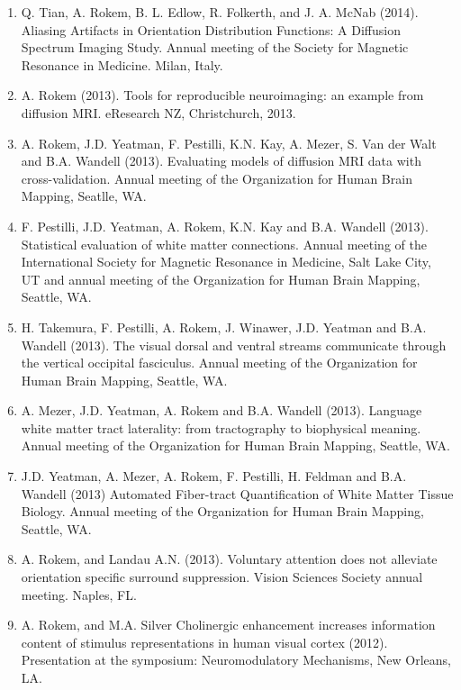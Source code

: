 \documentclass[11pt,fullpage]{article}
\begin{document}
\begin{enumerate}
\item Q. Tian, A. Rokem, B. L. Edlow, R. Folkerth, and J. A. McNab (2014). Aliasing Artifacts in Orientation Distribution Functions: A Diffusion Spectrum Imaging Study. Annual meeting of the Society for Magnetic Resonance in Medicine. Milan, Italy.

\item A. Rokem (2013). Tools for reproducible neuroimaging: an example from diffusion MRI. eResearch NZ, Christchurch, 2013.

\item A. Rokem, J.D. Yeatman, F. Pestilli, K.N. Kay, A. Mezer, S. Van der Walt and B.A. Wandell (2013). Evaluating models of diffusion MRI data with cross-validation. Annual meeting of the Organization for Human Brain Mapping, Seatlle, WA.

\item F. Pestilli, J.D. Yeatman, A. Rokem, K.N. Kay and B.A. Wandell (2013). Statistical evaluation of white matter connections. Annual meeting of the International Society for Magnetic Resonance in Medicine, Salt Lake City, UT and annual meeting of the Organization for Human Brain Mapping, Seattle, WA.

\item H. Takemura, F. Pestilli, A. Rokem, J. Winawer, J.D. Yeatman and B.A. Wandell (2013). The visual dorsal and ventral streams communicate through the vertical occipital fasciculus. Annual meeting of the Organization for Human Brain Mapping, Seattle, WA.

\item A. Mezer, J.D. Yeatman, A. Rokem and B.A. Wandell (2013). Language white matter tract laterality: from tractography to biophysical meaning. Annual meeting of the Organization for Human Brain Mapping, Seattle, WA.

\item J.D. Yeatman, A. Mezer, A. Rokem, F. Pestilli, H. Feldman and B.A. Wandell (2013) Automated Fiber-tract Quantification of White Matter Tissue Biology. Annual meeting of the Organization for Human Brain Mapping, Seattle, WA.

\item A. Rokem, and Landau A.N. (2013). Voluntary attention does not alleviate orientation specific surround suppression. Vision Sciences Society annual meeting. Naples, FL.

\item A. Rokem, and M.A. Silver Cholinergic enhancement increases information content of stimulus representations in human visual cortex (2012). Presentation at the symposium: Neuromodulatory Mechanisms, New Orleans, LA.


\end{enumerate}
\end{document}
